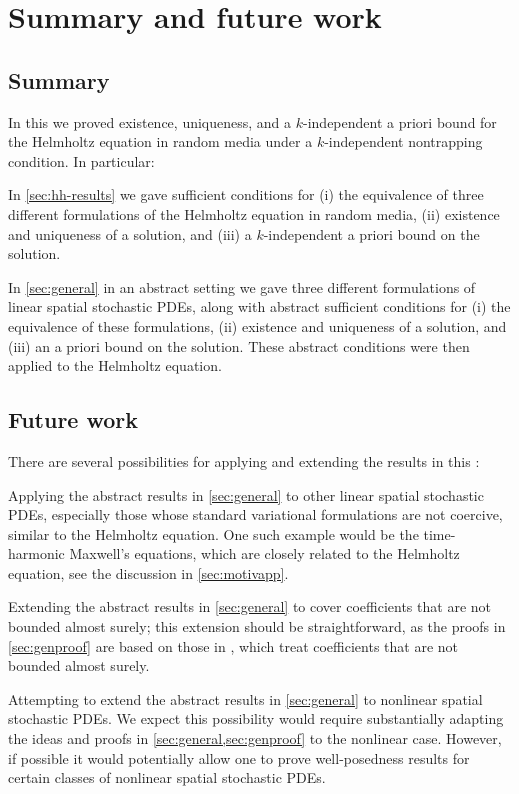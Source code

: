 \section{Summary and future work}

\subsection{Summary}
In this  we proved existence, uniqueness, and a $k$-independent a priori bound for the Helmholtz equation in random media under a $k$-independent nontrapping condition. In particular:
\bit
\item In \cref{sec:hh-results}  we gave sufficient conditions for (i) the equivalence of three different formulations of the Helmholtz equation in random media, (ii) existence and uniqueness of a solution, and (iii) a $k$-independent a priori bound on the solution.
  \item In \cref{sec:general} in an abstract setting we gave three different formulations of linear spatial stochastic PDEs, along with abstract sufficient conditions for (i) the equivalence of these formulations, (ii) existence and uniqueness of a solution, and (iii) an a priori bound on the solution. These abstract conditions were then applied to the Helmholtz equation.
\eit

\subsection{Future work}
There are several possibilities for applying and extending the results in this :
\bit
\item Applying the abstract results in \cref{sec:general} to other linear spatial stochastic PDEs, especially those whose standard variational formulations are not coercive, similar to the Helmholtz equation. One such example would be the time-harmonic Maxwell's equations, which are closely related to the Helmholtz equation, see the discussion in \cref{sec:motivapp}.
\item Extending the abstract results in \cref{sec:general} to cover coefficients that are not bounded almost surely; this extension should be straightforward, as the proofs in \cref{sec:genproof} are based on those in \cite{Gi:10,MuSt:11}, which treat coefficients that are not bounded almost surely.
  \item Attempting to extend the abstract results in \cref{sec:general} to nonlinear spatial stochastic PDEs. We expect this possibility would require substantially adapting the ideas and proofs in \cref{sec:general,sec:genproof} to the nonlinear case. However, if possible it would potentially allow one to prove well-posedness results for certain classes of nonlinear spatial stochastic PDEs.
\eit
